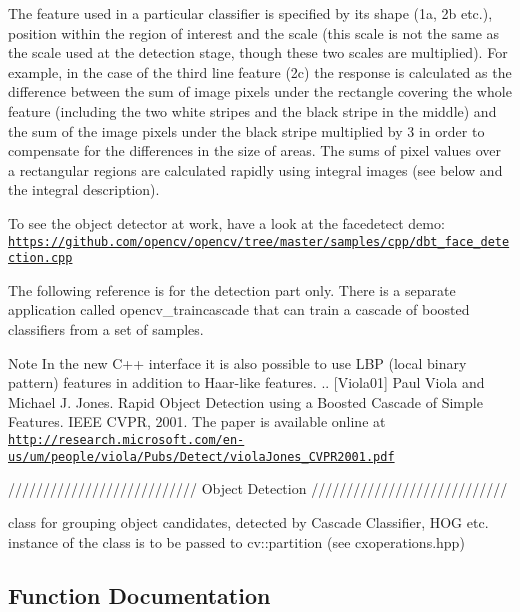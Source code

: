  

The feature used in a particular classifier is specified by its shape (1a, 2b etc.), position within the region of interest and the scale (this scale is not the same as the scale used at the detection stage, though these two scales are multiplied). For example, in the case of the third line feature (2c) the response is calculated as the difference between the sum of image pixels under the rectangle covering the whole feature (including the two white stripes and the black stripe in the middle) and the sum of the image pixels under the black stripe multiplied by 3 in order to compensate for the differences in the size of areas. The sums of pixel values over a rectangular regions are calculated rapidly using integral images (see below and the integral description). 

To see the object detector at work, have a look at the facedetect demo\+: \href{https://github.com/opencv/opencv/tree/master/samples/cpp/dbt_face_detection.cpp}{\tt https\+://github.\+com/opencv/opencv/tree/master/samples/cpp/dbt\+\_\+face\+\_\+detection.\+cpp} 

The following reference is for the detection part only. There is a separate application called opencv\+\_\+traincascade that can train a cascade of boosted classifiers from a set of samples. 

\begin{DoxyNote}{Note}
In the new C++ interface it is also possible to use L\+BP (local binary pattern) features in addition to Haar-\/like features. .. \mbox{[}Viola01\mbox{]} Paul Viola and Michael J. Jones. Rapid Object Detection using a Boosted Cascade of Simple Features. I\+E\+EE C\+V\+PR, 2001. The paper is available online at \href{http://research.microsoft.com/en-us/um/people/viola/Pubs/Detect/violaJones_CVPR2001.pdf}{\tt http\+://research.\+microsoft.\+com/en-\/us/um/people/viola/\+Pubs/\+Detect/viola\+Jones\+\_\+\+C\+V\+P\+R2001.\+pdf} 
\end{DoxyNote}


/////////////////////////// Object Detection //////////////////////////// 

class for grouping object candidates, detected by Cascade Classifier, H\+OG etc. instance of the class is to be passed to cv\+::partition (see cxoperations.\+hpp) 

\subsection{Function Documentation}
\mbox{\label{group__objdetect_ga3036d2996cee06be22e0eccda95a671b}} 
